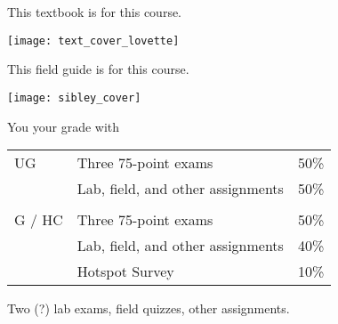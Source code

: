 \documentclass[t]{beamer}
\begin{document}
\begin{frame}[t,plain]{This textbook is  for this course.}
	\begin{center}
		\vspace{-\baselineskip}
		\texttt{[image: text\_cover\_lovette]}
	\end{center}
\end{frame}

\begin{frame}[t,plain]{This field guide is  for this course.}
	\begin{center}
		\vspace{-\baselineskip}
		\texttt{[image: sibley\_cover]}
	\end{center}
\end{frame}

%
\begin{frame}[t]{You  your grade with}
	\begin{center}\large\begin{tabular}{@{}lll@{}}
	UG		&	Three 75-point exams 				& 	50\% \\
			&	Lab, field, and other assignments	&   50\% \\
			&										&	\\
	G / HC	&	Three 75-point exams 				& 	50\% \\
			&	Lab, field, and other assignments	&   40\% \\
			&	Hotspot Survey 						&	10\% \\
		\end{tabular}
	\end{center}

\hangpara Two (?) lab exams, field quizzes, other assignments.

\end{frame}

%
%
%
%
%	
%	
%	
%	
\end{document}

